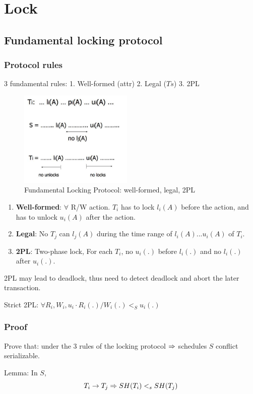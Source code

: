 \documentclass[a4paper]{report}
\begin{document}
\section{Lock}
\subsection{Fundamental locking protocol}
\subsubsection{Protocol rules}
3 fundamental rules: 1. Well-formed (attr) 2. Legal ($Ts$) 3. 2PL
\begin{figure}[H]
    \centerline{\includegraphics[height = 1.8in]{img/lockFundamental}}
    \caption{Fundamental Locking Protocol: well-formed, legal, 2PL}
  \label{fig:fundamentalLockingProtocol}
\end{figure}
\begin{enumerate}
\item \textbf{Well-formed}: $\forall$ R/W action. $T_i$ has to lock $l_i(A)$ before the action, and has to unlock $u_i(A)$ after the action.
\item \textbf{Legal}: No $T_j$ can $l_j(A)$ during the time range of $l_i(A) ... u_i(A)$ of $T_i$.
\item \textbf{2PL}: Two-phase lock, For each $T_i$, no $u_i(.)$ before $l_i(.)$ and no $l_i(.)$ after $u_i(.)$. 
\end{enumerate}

2PL may lead to deadlock, thus need to detect deadlock and abort the later transaction.

Strict 2PL: $\forall R_i, W_i, u_i \cdot R_i(.)/W_i(.) <_S u_i(.) $

\subsubsection{Proof}
Prove that: under the 3 rules of the locking protocol $\Rightarrow$ schedules $S$ conflict serializable. 

Lemma: In $S$, 
$$
T_i \rightarrow T_j \Rightarrow SH(T_i) <_s SH(T_j)
$$
\end{document}
